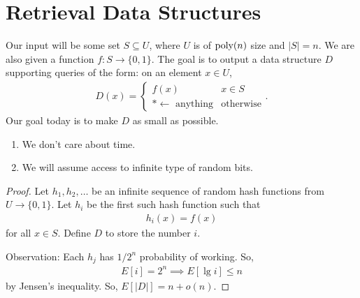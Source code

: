\documentclass{report}
\begin{document}
\chapter{Retrieval Data Structures}
\noindent Our input will be some set $S \subseteq U$, where $U$ is of $\text{poly}(n)$ size and $|S| = n$. We are also given a function $f: S \to \{0, 1\}$. The goal is to output a data structure $D$ supporting queries of the form: on an element $x \in U$, 
\begin{align*}
    D(x) = \begin{cases}
        f(x) & x \in S \\
        * \leftarrow \text{ anything} & \text{otherwise}
    \end{cases}.
\end{align*}
Our goal today is to make $D$ as small as possible. 
\begin{enumerate}
    \item We don't care about time.
    \item We will assume access to infinite type of random bits.
\end{enumerate}
\begin{proof}
    Let $h_1, h_2, \ldots$ be an infinite sequence of random hash functions from $U \to \{0,1\}$. Let $h_i$ be the first such hash function such that 
    \begin{align*}
        h_i(x) = f(x)
    \end{align*}
    for all $x \in S$. Define $D$ to store the number $i$. 

    \noindent Observation: Each $h_j$ has $1/2^n$ probability of working. So,
    \begin{align*}
        E[i] = 2^n \implies E[\lg i] \leq n
    \end{align*}
    by Jensen's inequality. So, $E[|D|] = n + o(n)$. 
\end{proof}
\end{document}
